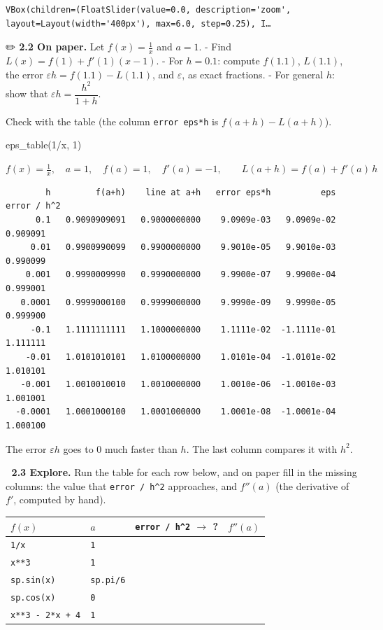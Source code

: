 \documentclass[
  letterpaper,
  DIV=11,
  numbers=noendperiod]{scrreprt}
\newenvironment{Shaded}{\begin{snugshade}}{\end{snugshade}}
\newcommand{\DecValTok}[1]{\textcolor[rgb]{0.68,0.00,0.00}{#1}}
\newcommand{\NormalTok}[1]{\textcolor[rgb]{0.00,0.23,0.31}{#1}}
\newcommand{\OperatorTok}[1]{\textcolor[rgb]{0.37,0.37,0.37}{#1}}
\newcounter{none} %
\theoremstyle{plain}
\theoremstyle{plain}
\theoremstyle{definition}
\theoremstyle{definition}
\theoremstyle{definition}
\theoremstyle{plain}
\theoremstyle{plain}
\theoremstyle{remark}
\begin{document}
\begin{verbatim}
VBox(children=(FloatSlider(value=0.0, description='zoom', layout=Layout(width='400px'), max=6.0, step=0.25), I…
\end{verbatim}

✏️ \textbf{2.2 On paper.} Let \(f(x)=\frac1x\) and \(a=1\). - Find
\(L(x) = f(1) + f'(1)(x-1)\). - For \(h = 0.1\): compute \(f(1.1)\),
\(L(1.1)\), the error \(\varepsilon h = f(1.1) - L(1.1)\), and
\(\varepsilon\), as exact fractions. - For general \(h\): show that
\(\varepsilon h = \dfrac{h^2}{1+h}\).

Check with the table (the column \texttt{error\ eps*h} is
\(f(a+h) - L(a+h)\)).

\begin{Shaded}
\begin{Highlighting}[]
\NormalTok{eps\_table(}\DecValTok{1}\OperatorTok{/}\NormalTok{x, }\DecValTok{1}\NormalTok{)}
\end{Highlighting}
\end{Shaded}

$\displaystyle f(x) = \frac{1}{x},\quad a = 1,\quad f(a) = 1,\quad f'(a) = -1,\qquad L(a+h) = f(a) + f'(a)\,h$

\begin{verbatim}
        h         f(a+h)    line at a+h   error eps*h          eps  error / h^2
      0.1   0.9090909091   0.9000000000    9.0909e-03   9.0909e-02     0.909091
     0.01   0.9900990099   0.9900000000    9.9010e-05   9.9010e-03     0.990099
    0.001   0.9990009990   0.9990000000    9.9900e-07   9.9900e-04     0.999001
   0.0001   0.9999000100   0.9999000000    9.9990e-09   9.9990e-05     0.999900
     -0.1   1.1111111111   1.1000000000    1.1111e-02  -1.1111e-01     1.111111
    -0.01   1.0101010101   1.0100000000    1.0101e-04  -1.0101e-02     1.010101
   -0.001   1.0010010010   1.0010000000    1.0010e-06  -1.0010e-03     1.001001
  -0.0001   1.0001000100   1.0001000000    1.0001e-08  -1.0001e-04     1.000100
\end{verbatim}

The error \(\varepsilon h\) goes to \(0\) much faster than \(h\). The
last column compares it with \(h^2\).

🔬 \textbf{2.3 Explore.} Run the table for each row below, and on paper
fill in the missing columns: the value that \texttt{error\ /\ h\^{}2}
approaches, and \(f''(a)\) (the derivative of \(f'\), computed by hand).

{\def\LTcaptype{none} %
\begin{longtable}[]{@{}llll@{}}
\toprule\noalign{}
\(f(x)\) & \(a\) & \texttt{error\ /\ h\^{}2} \(\to\) ? & \(f''(a)\) \\
\midrule\noalign{}
\endhead
\bottomrule\noalign{}
\endlastfoot
\texttt{1/x} & \texttt{1} & & \\
\texttt{x**3} & \texttt{1} & & \\
\texttt{sp.sin(x)} & \texttt{sp.pi/6} & & \\
\texttt{sp.cos(x)} & \texttt{0} & & \\
\texttt{x**3\ -\ 2*x\ +\ 4} & \texttt{1} & & \\
\end{longtable}
}
\end{document}
